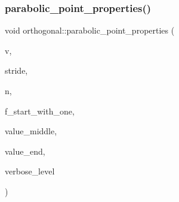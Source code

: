 \mbox{\label{classorthogonal_a0650d32c951152fad324844a16fea1c2}} 
\subsubsection{\texorpdfstring{parabolic\+\_\+point\+\_\+properties()}{parabolic\_point\_properties()}}
{\footnotesize\ttfamily void orthogonal\+::parabolic\+\_\+point\+\_\+properties (\begin{DoxyParamCaption}\item[{\mbox{\hyperlink{galois_8h_a09fddde158a3a20bd2dcadb609de11dc}{I\+NT}} $\ast$}]{v,  }\item[{\mbox{\hyperlink{galois_8h_a09fddde158a3a20bd2dcadb609de11dc}{I\+NT}}}]{stride,  }\item[{\mbox{\hyperlink{galois_8h_a09fddde158a3a20bd2dcadb609de11dc}{I\+NT}}}]{n,  }\item[{\mbox{\hyperlink{galois_8h_a09fddde158a3a20bd2dcadb609de11dc}{I\+NT}} \&}]{f\+\_\+start\+\_\+with\+\_\+one,  }\item[{\mbox{\hyperlink{galois_8h_a09fddde158a3a20bd2dcadb609de11dc}{I\+NT}} \&}]{value\+\_\+middle,  }\item[{\mbox{\hyperlink{galois_8h_a09fddde158a3a20bd2dcadb609de11dc}{I\+NT}} \&}]{value\+\_\+end,  }\item[{\mbox{\hyperlink{galois_8h_a09fddde158a3a20bd2dcadb609de11dc}{I\+NT}}}]{verbose\+\_\+level }\end{DoxyParamCaption})}

\mbox{\label{classorthogonal_aadca2791fa70e971edf85858b725502d}} 
